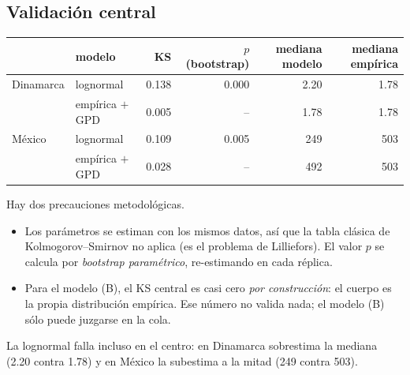 \documentclass[11pt,reqno]{amsart}
\theoremstyle{definition}\newtheorem{definition}[theorem]{Definición}
\theoremstyle{remark}\newtheorem{remark}[theorem]{Observación}
\begin{document}
\subsection{Validación central}
\begin{center}
\begin{tabular}{llrrrr}
\toprule
& modelo & KS & $p$ (bootstrap) & mediana modelo & mediana empírica\\
\midrule
Dinamarca & lognormal & 0.138 & 0.000 & 2.20 & 1.78\\
& empírica $+$ GPD & 0.005 & -- & 1.78 & 1.78\\
México & lognormal & 0.109 & 0.005 & 249 & 503\\
& empírica $+$ GPD & 0.028 & -- & 492 & 503\\
\bottomrule
\end{tabular}
\end{center}
Hay dos precauciones metodológicas.
\begin{itemize}[leftmargin=2em]
\item Los parámetros se estiman con los mismos datos, así que la tabla clásica de Kolmogorov--Smirnov no aplica (es el problema de Lilliefors). El valor $p$ se calcula por \emph{bootstrap paramétrico}, re-estimando en cada réplica.
\item Para el modelo (B), el KS central es casi cero \emph{por construcción}: el cuerpo es la propia distribución empírica. Ese número no valida nada; el modelo (B) sólo puede juzgarse en la cola.
\end{itemize}
La lognormal falla incluso en el centro: en Dinamarca sobrestima la mediana (2.20 contra 1.78) y en México la subestima a la mitad (249 contra 503).
\end{document}
